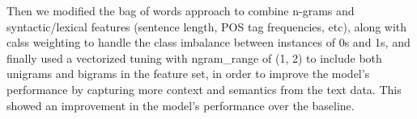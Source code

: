 Then we modified the bag of words approach to combine n-grams and syntactic/lexical features (sentence length, POS tag frequencies, etc), along with calss weighting to handle the class imbalance between instances of 0s and 1s, and finally used a vectorized tuning with ngram\_range of (1, 2) to include both unigrams and bigrams in the feature set, in order to improve the model's performance by capturing more context and semantics from the text data. This showed an improvement in the model's performance over the baseline. 